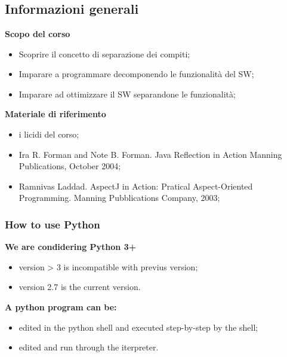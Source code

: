 \section{}

\subsection{Informazioni generali}

\textbf{Scopo del corso}
\begin{itemize}
	\item Scoprire il concetto di separazione dei compiti;
	\item Imparare a programmare decomponendo le funzionalità del SW;
	\item Imparare ad ottimizzare il SW separandone le funzionalità;
	\end{itemize}
\textbf{Materiale di riferimento}
\begin{itemize}
	\item i licidi del corso;
	\item Ira R. Forman and Note B. Forman. Java Reflection in Action Manning Publications, October 2004;
	\item Ramnivas Laddad. AspectJ in Action: Pratical Aspect-Oriented Programming. Manning Pubblications Company, 2003;
\end{itemize}



















\subsubsection{How to use Python}	
\textbf{We are condidering Python 3+}
\begin{itemize}
	\item version > 3 is incompatible with previus version;
	\item version 2.7 is the current version.
\end{itemize}
\textbf{A python program can be:}
\begin{itemize}
	\item edited in the python shell and executed step-by-step by the shell;
	\item edited and run through the iterpreter.
\end{itemize}

